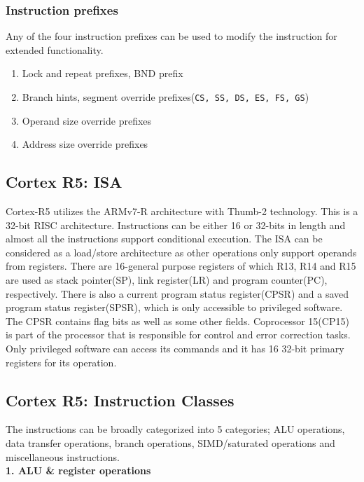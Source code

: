 \documentclass[a4paper,11pt]{article}
\begin{document}
\subsubsection{Instruction prefixes\cite{x64asm}}

Any of the four instruction prefixes can be used to modify the instruction for extended functionality.
\begin{enumerate}[~~1.]
	\item	Lock and repeat prefixes, BND prefix
	\item	Branch hints, segment override prefixes({\tt CS, SS, DS, ES, FS, GS})
	\item	Operand size override prefixes
	\item	Address size override prefixes
\end{enumerate}

\subsection{Cortex R5: ISA}
Cortex-R5 utilizes the ARMv7-R architecture with Thumb-2 technology. This is a 32-bit RISC architecture. Instructions can be either 16 or 32-bits in length and almost all the instructions support conditional execution. The ISA can be considered as a load/store architecture as other operations only support operands from registers. There are 16-general purpose registers of which R13, R14 and R15 are used as stack pointer(SP), link register(LR) and program counter(PC), respectively. There is also a current program status register(CPSR) and a saved program status register(SPSR), which is only accessible to privileged software. The CPSR contains flag bits as well as some other fields. Coprocessor 15(CP15) is part of the processor that is responsible for control and error correction tasks. Only privileged software can access its commands and it has 16 32-bit primary registers for its operation.
\subsection{Cortex R5: Instruction Classes}
The instructions can be broadly categorized into 5 categories; ALU operations, data transfer operations, branch operations, SIMD/saturated operations and miscellaneous instructions.\cite{ARMpg}\\

\textbf{1. ALU \& register operations}\\
\end{document}
